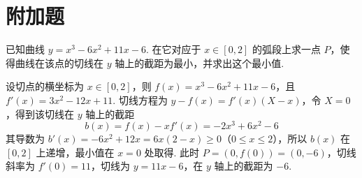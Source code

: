 \documentclass[UTF8,a4paper,oneside,11pt]{ctexbook}
\begin{document}
\section{附加题}

\begin{problem}

已知曲线 \(y=x^3-6x^2+11x-6\). 在它对应于 \(x\in\left[0,2\right]\) 的弧段上求一点 \(P\)，使得曲线在该点的切线在 \(y\) 轴上的截距为最小，并求出这个最小值.

\begin{solution}
设切点的横坐标为 \(x\in[0,2]\)，则 \(f(x)=x^3-6x^2+11x-6\)，且 \(f'(x)=3x^2-12x+11\). 切线方程为 \(y-f(x)=f'(x)(X-x)\)，令 \(X=0\)，得到该切线在 \(y\) 轴上的截距
\[
b(x)=f(x)-xf'(x)=-2x^3+6x^2-6
\]
其导数为 \(b'(x)=-6x^2+12x=6x(2-x)\geqslant0\)（\(0\leqslant x\leqslant2\)），所以 \(b(x)\) 在 \([0,2]\) 上递增，最小值在 \(x=0\) 处取得. 此时 \(P=(0,f(0))=(0,-6)\)，切线斜率为 \(f'(0)=11\)，切线为 \(y=11x-6\)，在 \(y\) 轴上的截距为 \(-6\).
\end{solution}
\end{problem}

\end{document}
